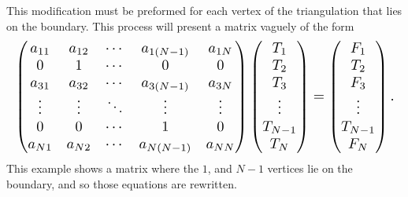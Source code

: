 \documentclass[../fem.tex]{subfiles}
\begin{document}
This modification must be preformed for each vertex of the triangulation that
lies on the boundary. This process will present a matrix vaguely of the form
\begin{align*}
  \resizebox{\columnwidth}{!}{$
  \begin{pmatrix}
    a_{11} & a_{12} & \cdots & a_{1(N-1)}& a_{1N}\\
    0 & 1 & \cdots & 0 & 0\\
    a_{31} & a_{32} & \cdots & a_{3(N-1)} & a_{3N}\\
    \vdots & \vdots & \ddots & \vdots & \vdots\\
    0 & 0 & \cdots & 1 & 0\\
    a_{N1} & a_{N2} & \cdots & a_{N(N-1)} & a_{NN}
  \end{pmatrix}
  \begin{pmatrix}
    T_1 \\ T_2 \\ T_3 \\ \vdots \\ T_{N-1} \\ T_N
  \end{pmatrix}
  =
  \begin{pmatrix}
    F_1 \\ T_2 \\ F_3 \\ \vdots \\ T_{N-1} \\ F_N
\end{pmatrix}.$}
\end{align*}
This example shows a matrix where the $1$, and $N-1$ vertices lie on the
boundary, and so those equations are rewritten.
\end{document}
